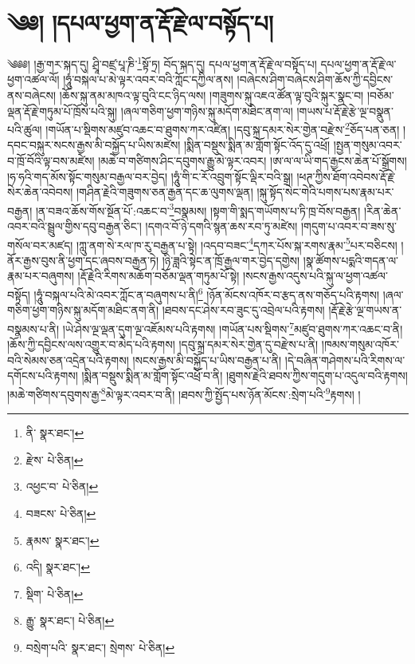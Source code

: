 \setcounter{footnote}{0} 
\chapter{༄༅། །དཔལ་ཕྱག་ན་རྡོ་རྗེ་ལ་བསྟོད་པ།}༄༅༅། །རྒྱ་གར་སྐད་དུ། ཤྲཱི་བཛྲ་པཱ་ཎི་\footnote{ནི་  སྣར་ཐང་། }སྟོ་ཏྲ། བོད་སྐད་དུ། དཔལ་ཕྱག་ན་རྡོ་རྗེ་ལ་བསྟོད་པ། དཔལ་ཕྱག་ན་རྡོ་རྗེ་ལ་ཕྱག་འཚལ་ལོ། །ཧཱུཾ་བསྐལ་པ་མེ་ལྟར་འབར་བའི་ཀློང་དཀྱིལ་ནས། །བཞེངས་ཤིག་བཞེངས་ཤིག་ཆོས་ཀྱི་དབྱིངས་ནས་བཞེངས། །ཆོས་སྐུ་ནམ་མཁའ་ལྟ་བུའི་ངང་ཉིད་ལས། །གཟུགས་སྐུ་འཇའ་ཚོན་ལྟ་བུའི་སྐུར་སྣང་བ། །བཅོམ་ལྡན་རྡོ་རྗེ་གཏུམ་པོ་ཁྲོས་པའི་སྐུ། །ཞལ་གཅིག་ཕྱག་གཉིས་སྐུ་མདོག་མཐིང་ནག་ལ། །གཡས་པ་རྡོ་རྗེ་རྩེ་ལྔ་བསྣུན་པའི་ཚུལ། །གཡོན་པ་སྡིགས་མཛུབ་འཆང་བ་ཐུགས་ཀར་འཛིན། །དབུ་སྐྲ་དམར་སེར་གྱེན་བརྫེས་\footnote{རྫེས་  པེ་ཅིན། }ཅོད་པན་ཅན། །དབང་བསྐུར་སངས་རྒྱས་མི་བསྐྱོད་པ་ཡིས་མཛེས། །སྨིན་བསྡུས་སྨིན་མ་གློག་སྟོང་འོད་དུ་འཕྲོ། །སྤྱན་གསུམ་འབར་བ་ཁྲོ་བོའི་ལྟ་བས་མཛེས། །མཆེ་བ་གཙིགས་ཤིང་དབུགས་རྒྱུ་མེ་ལྟར་འབར། །ཨ་ལ་ལ་ཡི་གད་རྒྱངས་ཆེན་པོ་སྒྲོགས། །ཧ་ཧའི་གད་མོས་སྟོང་གསུམ་བརྒྱལ་བར་བྱེད། །ཧཱུཾ་གི་ང་རོ་འབྲུག་སྟོང་ལྡིར་བའི་སྒྲ། །ཕཊ་ཀྱིས་ཐོག་འབེབས་རྡོ་རྗེ་སེར་ཆེན་འབེབས། །གཤིན་རྗེའི་གཟུགས་ཅན་རྒྱན་དང་ཆ་ལུགས་ལྡན། །སྐུ་སྟོད་སེང་གེའི་པགས་པས་རྣམ་པར་བརྒྱན། །ན་བཟའ་ཆོས་གོས་སྔོན་པོ་:འཆང་བ་\footnote{འཕྱང་བ་  པེ་ཅིན། }བསྣམས། །སྟག་གི་སྨད་གཡོགས་པ་ཏི་ཁྲ་བོས་བརྒྱན། །རིན་ཆེན་འབར་བའི་སྦྲུལ་གྱིས་དབུ་བརྒྱན་ཅིང་། །དགའ་བོ་ཉེ་དགའི་སྙན་ཆས་རབ་ཏུ་མཛེས། །གདུག་པ་འབར་བ་ཟས་སུ་གསོལ་བར་མཛད། །ཀླུ་ནག་སེ་རལ་ཁ་རུ་བརྒྱན་པ་སྟེ། །འདབ་བཟང་\footnote{བཟངས་  པེ་ཅིན། }དཀར་པོས་སྐ་རགས་རྣམ་\footnote{རྣམས་  སྣར་ཐང་། }པར་བཅིངས། །ནོར་རྒྱས་བུས་ནི་ཕྱག་དང་ཞབས་བརྒྱན་ཏེ། །ཉི་ཟླའི་སྟེང་ན་ཁྲོ་རྒྱལ་གར་བྱེད་དགྱེས། །སྣ་ཚོགས་པདྨའི་གདན་ལ་རྣམ་པར་བཞུགས། །རྡོ་རྗེའི་རིགས་མཆོག་བཅོམ་ལྡན་གཏུམ་པོ་སྟེ། །སངས་རྒྱས་འདུས་པའི་སྐུ་ལ་ཕྱག་འཚལ་བསྟོད། །ཧཱུཾ་བསྐལ་པའི་མེ་འབར་ཀློང་ན་བཞུགས་པ་ནི།\footnote{འདི།  སྣར་ཐང་། } །ཉོན་མོངས་འཁོར་བ་རྩད་ནས་གཅོད་པའི་རྟགས། །ཞལ་གཅིག་ཕྱག་གཉིས་སྐུ་མདོག་མཐིང་ནག་ནི། །ཐབས་དང་ཤེས་རབ་ཟུང་དུ་འབྲེལ་པའི་རྟགས། །རྡོ་རྗེ་རྩེ་ལྔ་གཡས་ན་བསྣམས་པ་ནི། །ཡེ་ཤེས་ལྔ་ལྡན་དུག་ལྔ་འཇོམས་པའི་རྟགས། །གཡོན་པས་སྡིགས་\footnote{སྡིག་  པེ་ཅིན། }མཛུབ་ཐུགས་ཀར་འཆང་བ་ནི། །ཆོས་ཀྱི་དབྱིངས་ལས་འགྱུར་བ་མེད་པའི་རྟགས། །དབུ་སྐྲ་དམར་སེར་གྱེན་དུ་བརྫེས་པ་ནི། །ཁམས་གསུམ་འཁོར་བའི་སེམས་ཅན་འདྲེན་པའི་རྟགས། །སངས་རྒྱས་མི་བསྐྱོད་པ་ཡིས་བརྒྱན་པ་ནི། །དེ་བཞིན་གཤེགས་པའི་རིགས་ལ་དགོངས་པའི་རྟགས། །སྨིན་བསྡུས་སྨིན་མ་གློག་སྟོང་འཕྲོ་བ་ནི། །ཐུགས་རྗེའི་ཐབས་ཀྱིས་གདུག་པ་འདུལ་བའི་རྟགས། །མཆེ་གཙིགས་དབུགས་རྒྱ་\footnote{རྒྱུ་  སྣར་ཐང་།  པེ་ཅིན། }མེ་ལྟར་འབར་བ་ནི། །ཐབས་ཀྱི་སྤྱོད་པས་ཉོན་མོངས་:སྲེག་པའི་\footnote{བསྲེག་པའི་  སྣར་ཐང་། སྲེགས་  པེ་ཅིན། }རྟགས། །
